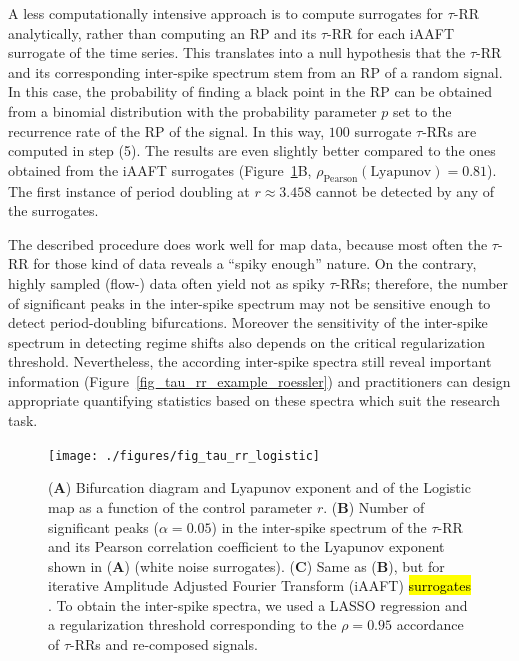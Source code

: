 \documentclass[entropy,article,accept,pdftex,moreauthors]{Definitions/mdpi}
\begin{document}
A less computationally intensive approach is to compute surrogates for $\tau$-RR analytically, rather than computing an RP and its $\tau$-RR for each iAAFT surrogate of the 
time series. This translates into a null hypothesis 
that the $\tau$-RR and its corresponding inter-spike spectrum stem from an RP of a random signal. In this case, the probability of finding a black point in the RP can be obtained 
from a binomial distribution with the probability parameter $p$ set to the recurrence rate of the RP of the signal. In this way, $100$ surrogate $\tau$-RRs are computed in step (5). 
The results are even slightly better compared to the ones obtained from the iAAFT surrogates (Figure~\ref{fig_tau_rr_logistic}B, $\rho_{\text{Pearson}}(\text{Lyapunov})=0.81$). 
The first instance of period doubling at $r \approx 3.458$ cannot be detected by any of the surrogates.

The described procedure does work well for map data, because most often the $\tau$-RR for those kind of data reveals a ``spiky enough'' nature. 
On the contrary, highly sampled (flow-) data often yield not as 
spiky $\tau$-RRs; therefore, the number of significant peaks in the inter-spike spectrum may not be sensitive enough to detect period-doubling bifurcations. Moreover the sensitivity of the 
inter-spike spectrum in detecting regime shifts also depends on the critical regularization threshold. Nevertheless, the 
according inter-spike spectra still reveal important information (Figure~\ref{fig_tau_rr_example_roessler}) and practitioners can design appropriate quantifying statistics based 
on these spectra which suit the research task.

\begin{figure}[H]
 \texttt{[image: ./figures/fig\_tau\_rr\_logistic]}
 \caption{(\textbf{A}) Bifurcation diagram and Lyapunov exponent and of the Logistic map as a function of the control parameter $r$.
 (\textbf{B}) Number of significant peaks ($\alpha=0.05$) in the inter-spike spectrum of the $\tau$-RR and its Pearson correlation coefficient to the Lyapunov exponent shown in (\textbf{A})
 (white noise surrogates). 
 (\textbf{C}) Same as (\textbf{B}), but for iterative Amplitude Adjusted Fourier Transform (iAAFT) \hl{surrogates} %
 \cite{Schreiber1996,Schreiber2000}. To obtain the inter-spike spectra, we used 
 a LASSO regression and a regularization threshold corresponding to the $\rho=0.95$ accordance of $\tau$-RRs and re-composed signals.  
}
\label{fig_tau_rr_logistic}
\end{figure}
\end{document}
